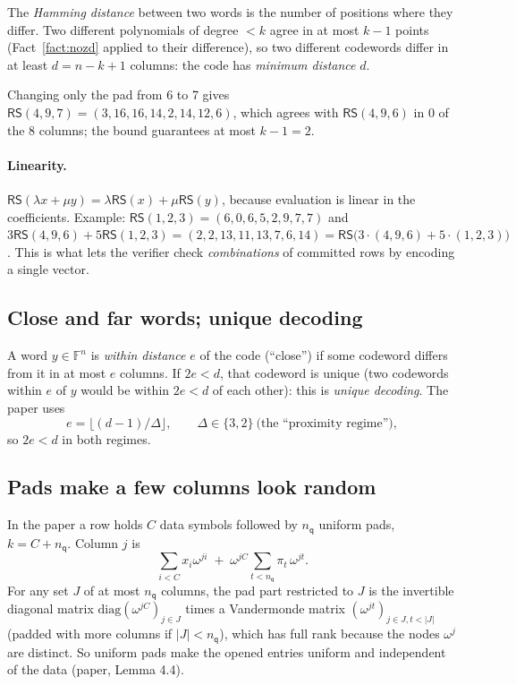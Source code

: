 \documentclass[11pt,a4paper]{article}
\newcommand{\F}{\mathbb{F}}
\newcommand{\RS}{\mathsf{RS}}
\newcommand{\nq}{n_{\mathsf{q}}}
\theoremstyle{definition}
\theoremstyle{plain}
\begin{document}
The \emph{Hamming distance} between two words is the number of positions where they differ.
Two different polynomials of degree $<k$ agree in at most $k-1$ points (Fact~\ref{fact:nozd} applied
to their difference), so two different codewords differ in at least $d=n-k+1$ columns: the code has
\emph{minimum distance} $d$.

\begin{example}
Changing only the pad from 6 to 7 gives $\RS(4,9,7)=(3,16,16,14,2,14,12,6)$, which agrees with
$\RS(4,9,6)$ in $0$ of the $8$ columns; the bound guarantees at most $k-1=2$.
\end{example}

\paragraph{Linearity.} $\RS(\lambda x+\mu y)=\lambda\RS(x)+\mu\RS(y)$, because evaluation is linear in
the coefficients. Example: $\RS(1,2,3)=(6,0,6,5,2,9,7,7)$ and
$3\RS(4,9,6)+5\RS(1,2,3)=(2,2,13,11,13,7,6,14)=\RS\bigl(3\cdot(4,9,6)+5\cdot(1,2,3)\bigr)$.
This is what lets the verifier check \emph{combinations} of committed rows by encoding a single vector.

\subsection{Close and far words; unique decoding}

A word $y\in\F^n$ is \emph{within distance $e$} of the code (``close'') if some codeword differs from
it in at most $e$ columns. If $2e<d$, that codeword is unique (two codewords within $e$ of $y$ would
be within $2e<d$ of each other): this is \emph{unique decoding}. The paper uses
\[
  e=\lfloor (d-1)/\Delta\rfloor,\qquad \Delta\in\{3,2\}\ \text{(the ``proximity regime'')},
\]
so $2e<d$ in both regimes.

\subsection{Pads make a few columns look random}
\label{sec:hiding}

In the paper a row holds $C$ data symbols followed by $\nq$ uniform pads, $k=C+\nq$. Column $j$ is
\[
  \sum_{i<C}x_i\omega^{ji}\;+\;\omega^{jC}\sum_{t<\nq}\pi_t\,\omega^{jt}.
\]
For any set $J$ of at most $\nq$ columns, the pad part restricted to $J$ is the invertible diagonal
matrix $\mathrm{diag}(\omega^{jC})_{j\in J}$ times a Vandermonde matrix $(\omega^{jt})_{j\in J,t<|J|}$
(padded with more columns if $|J|<\nq$), which has full rank because the nodes $\omega^j$ are distinct.
So uniform pads make the opened entries uniform and independent of the data
(paper, Lemma 4.4).
\end{document}
